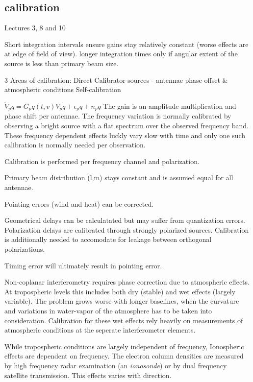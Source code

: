 \documentclass[a4paper,10pt]{report}
\begin{document}
\subsection{calibration}
{\color{red}
Lectures 3, 8 and 10


Short integration intervals ensure gains stay relatively constant (worse effects are at edge of field of view). longer integration times only if angular extent of the source is less than primary beam size.

3 Areas of calibration:
Direct
Calibrator sources - antennae phase offset \& atmospheric conditions
Self-calibration

$\tilde V_pq = G_pq(t,v)V_pq + \epsilon_pq + n_pq$
The gain is an amplitude multiplication and phase shift per antennae. The frequency variation is normally calibrated by observing a bright
source with a flat spectrum over the observed frequency band. These frequency dependent effects luckly vary slow with time and only one such
calibration is normally needed per observation.

Calibration is performed per frequency channel and polarization.

Primary beam distribution (l,m) stays constant and is assumed equal for all antennae.

Pointing errors (wind and heat) can be corrected.

Geometrical delays can be calculatated but may suffer from quantization errors. Polarization delays are calibrated through strongly 
polarized sources. Calibration is additionally needed to accomodate for leakage between orthogonal polarizations.

Timing error will ultimately result in pointing error.

Non-coplanar interferometry requires phase correction due to atmospheric effects. At tropospheric levels this includes both dry (stable) and wet effects (largely variable). The problem grows worse with longer baselines, when the curvature and variations in 
water-vapor of the atmosphere has to be taken into consideration. Calibration for these wet effects rely heavily on measurements of atmospheric conditions at the seperate interferometer elements.

While tropospheric conditions are largely independent of frequency, Ionospheric effects are dependent on frequency. The electron column densities are measured by high frequency radar examination (an \textit{ionosonde}) or by dual frequency satellite transmission. This effects
varies with direction.

}
\end{document}
